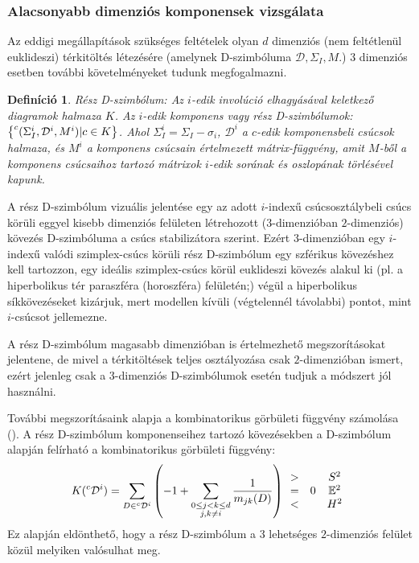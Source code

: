 \documentclass[12pt,magyar,a4paper]{article}
\newcommand{\leftexp}[2]{{\vphantom{#2}}^{#1}{#2}}
\newtheorem{defn}[thm]{Definíció}
\begin{document}
\subsubsection{Alacsonyabb dimenziós komponensek vizsgálata}
Az eddigi megállapítások szükséges feltételek olyan $d$ dimenziós (nem
feltétlenül euklideszi) térkitöltés létezésére (amelynek D-szimbóluma
$\mathcal{D}, \Sigma_I, M$.) $3$ dimenziós esetben további követelményeket
tudunk megfogalmazni.

\begin{defn}
  Rész D-szimbólum: Az $i$-edik involúció elhagyásával keletkező diagramok
  halmaza $K$. Az $i$-edik komponens vagy rész D-szimbólumok:
  $\left\{\leftexp{c}(\Sigma_I^i,\mathcal{D}^i,M^i)|c \in K\right\}$. Ahol
  $\Sigma_I^i=\Sigma_I-{\sigma_i}$, $\mathcal{D}^i$ a $c$-edik komponensbeli
  csúcsok halmaza, és $M^i$ a komponens csúcsain értelmezett mátrix-függvény,
  amit $M$-ből a komponens csúcsaihoz tartozó mátrixok $i$-edik sorának és
  oszlopának törlésével kapunk.
\end{defn}

A rész D-szimbólum vizuális jelentése egy az adott $i$-indexű csúcsosztálybeli
csúcs körüli eggyel kisebb dimenziós felületen létrehozott ($3$-dimenzióban
$2$-dimenziós) kövezés D-szimbóluma a csúcs stabilizátora szerint. Ezért
$3$-dimenzióban egy $i$-indexű valódi szimplex-csúcs körüli rész D-szimbólum egy
szférikus kövezéshez kell tartozzon, egy ideális szimplex-csúcs körül euklideszi
kövezés alakul ki (pl. a hiperbolikus tér paraszféra (horoszféra) felületén;)
végül a hiperbolikus síkkövezéseket kizárjuk, mert modellen kívüli (végtelennél
távolabbi) pontot, mint $i$-csúcsot jellemezne.

A rész D-szimbólum magasabb dimenzióban is értelmezhető megszorításokat
jelentene, de mivel a térkitöltések teljes osztályozása csak $2$-dimenzióban
ismert, ezért jelenleg csak a $3$-dimenziós D-szimbólumok esetén tudjuk a
módszert jól használni.

További megszorításaink alapja a kombinatorikus görbületi függvény számolása
(\cite{Emil}). A rész D-szimbólum komponenseihez tartozó kövezésekben a
D-szimbólum alapján felírható a kombinatorikus görbületi függvény:
\begin{align*}
  K(\leftexp{c}{\mathcal{D}}^i)=\sum_{D\in
  \leftexp{c}{\mathcal{D}}^i}\left(-1+\sum_{\substack{0\le j<k\le d \\
  j,k\ne i}}\frac{1}{m_{jk}(D)}\right)
  \begin{array}{cccc}
    > & & S^2 \\
    = & 0 & \mathbb{E}^2 \\
    < & & H^2
  \end{array}
\end{align*}
Ez alapján eldönthető, hogy a rész D-szimbólum a 3 lehetséges $2$-dimenziós
felület közül melyiken valósulhat meg.
\end{document}
